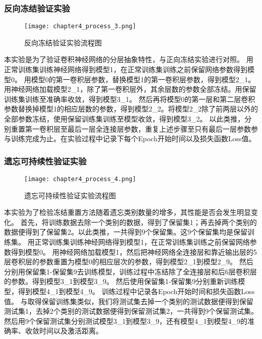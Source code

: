 \subsubsection{反向冻结验证实验}
\begin{figure}
    \centering
    \texttt{[image: chapter4\_process\_3.png]}
    \caption{反向冻结验证实验流程图}
    \label{fig:chapter4_process_3}
\end{figure}

本实验是为了验证卷积神经网络的分层抽象特性，与正向冻结实验进行对照。
用正常训练集训练神经网络得到模型1，在正常训练集训练之前保留网络参数得到模型0。
用模型0的第一卷积层参数，替换模型1的第一卷积层参数，得到模型2\_1。
用神经网络加载模型2\_1，除了第一卷积层外，其余层数的参数全部冻结。用保留训练集训练至准确率收敛，得到模型3\_1。
然后再将模型0的第一层和第二层卷积参数替换掉模型1的相应层数的参数，得到模型2\_2。将模型2\_2除了前两层以外的全部参数冻结，使用保留训练集训练至模型收敛，得到模型3\_2。
以此类推，分别重置第一卷积层至最后一层全连接层参数，重复上述步骤至只有最后一层参数参与训练完成为止。在实验过程中记录下每个Epoch开始时间以及损失函数Loss值。

\subsubsection{遗忘可持续性验证实验}
\begin{figure}
    \centering
    \texttt{[image: chapter4\_process\_4.png]}
    \caption{遗忘可持续性验证实验流程图}
    \label{fig:chapter4_process_4}
\end{figure}

本实验为了检验冻结重置方法随着遗忘类别数量的增多，其性能是否会发生明显变化。
首先，将训练数据去除一个类别的数据，得到了保留集1；再去掉两个类别的数据便得到了保留集2。以此类推，一共得到9个保留集。这9个保留集均是保留训练集。
用正常训练集训练神经网络得到模型1，在正常训练集训练之前保留网络参数得到模型0。
用神经网络加载模型1，然后把神经网络全连接层和靠近输出层的5层卷积层的参数重置为模型0的相应层次的参数，得到模型2\_1到模型2\_9。
然后分别用保留集1-保留集9去训练模型，训练过程中冻结除了全连接层和后6层卷积层的参数。得到模型3\_1到模型3\_9。
然后使用保留集1-保留集9分别重新训练模型，得到模型4\_1到模型4\_9。
训练过程中记录各Epoch开始时间和损失函数Loss值。
与取得保留训练集类似，我们将测试集去掉一个类别的测试数据便得到保留测试集1，去掉2个类别的测试数据便得到保留测试集2，一共得到9个保留测试集。
然后用9个保留测试集分别测试模型3\_1到模型3\_9，还有模型4\_1到模型4\_9的准确率、收敛时间以及激活距离。

